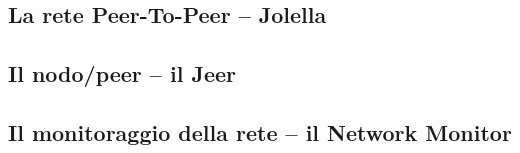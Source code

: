 
\subsection{La rete Peer-To-Peer -- Jolella}

\subsection{Il nodo/peer -- il Jeer}

\subsection{Il monitoraggio della rete -- il Network Monitor}

